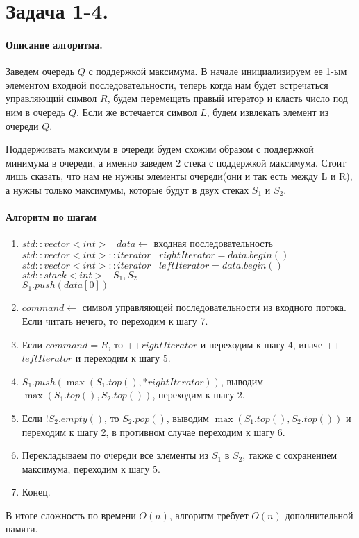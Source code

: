 \documentclass[12pt]{article}
\begin{document}
\section{Задача 1-4.} 
\paragraph{Описание алгоритма.}
Заведем очередь $ Q $ с поддержкой максимума. В начале инициализируем ее 1-ым элементом входной последовательности, 
теперь когда нам будет встречаться управляющий символ $ R $, будем перемещать правый
итератор и класть число под ним в очередь $ Q $. Если же встечается символ $ L $, будем извлекать 
элемент из очереди $ Q $.

Поддерживать максимум в очереди будем схожим образом с поддержкой минимума в очереди, а именно заведем 2 стека с 
поддержкой максимума. Стоит лишь сказать, что нам не нужны элементы очереди(они и так есть между L и R), 
а нужны только максимумы, которые будут в двух стеках $ S_1 $ и $ S_2 $. 


\paragraph{Алгоритм по шагам}
\begin{enumerate}
    \item $ std::vector<int> \;\;\; data \leftarrow $ входная последовательность \\
          $ std::vector<int>::iterator \;\;\; rightIterator = data.begin() $ \\
          $ std::vector<int>::iterator \;\;\; leftIterator = data.begin() $ \\
          $ std::stack<int> \;\;\; S_1, S_2 $ \\
          $ S_1.push(data[0]) $
    \item $ command \leftarrow $ символ управляющей последовательности из входного потока.
          Если читать нечего, то переходим к шагу 7.
    \item Если $ command = R $, то   ++$rightIterator $ и переходим к шагу 4, иначе ++$leftIterator$ и переходим к шагу 5.
    \item $ S_1.push(\max(S_1.top(), *rightIterator)) $, выводим $ \max(S_1.top(), S_2.top()) $, переходим к шагу 2.
    \item Если $ ! S_2.empty() $, то $ S_2.pop() $, выводим $ \max(S_1.top(), S_2.top()) $ и переходим к шагу 2,
          в противном случае переходим к шагу 6.
    \item Перекладываем по очереди все элементы из $ S_1 $ в $ S_2 $, также с сохранением максимума, переходим к шагу 5.
    \item Конец.
\end{enumerate}

В итоге сложность по времени $ O(n) $, алгоритм требует $ O(n) $ дополнительной памяти.
\end{document}
